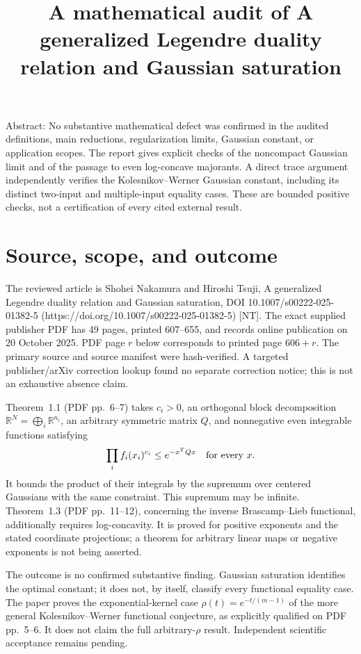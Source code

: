 \documentclass[10pt]{article}
\title{A mathematical audit of
A generalized Legendre duality relation and Gaussian saturation}
\author{}
\date{}
\begin{document}
\maketitle
Abstract: No substantive mathematical defect was confirmed in the audited definitions, main reductions, regularization limits, Gaussian constant, or application scopes. The report gives explicit checks of the noncompact Gaussian limit and of the passage to even log-concave majorants. A direct trace argument independently verifies the Kolesnikov–Werner Gaussian constant, including its distinct two-input and multiple-input equality cases. These are bounded positive checks, not a certification of every cited external result.\par
\section*{Source, scope, and outcome}
The reviewed article is Shohei Nakamura and Hiroshi Tsuji, A generalized Legendre duality relation and Gaussian saturation, DOI 10.1007/s00222-025-01382-5 (https://doi.org/10.1007/s00222-025-01382-5) [NT]. The exact supplied publisher PDF has 49 pages, printed 607–655, and records online publication on 20 October 2025. PDF page \(r\) below corresponds to printed page \(606+r\). The primary source and source manifest were hash-verified. A targeted publisher/arXiv correction lookup found no separate correction notice; this is not an exhaustive absence claim.\par
Theorem 1.1 (PDF pp. 6–7) takes \(c_i>0\), an orthogonal block decomposition \(\mathbb R^N=\bigoplus_i\mathbb R^{n_i}\), an arbitrary symmetric matrix \(Q\), and nonnegative even integrable functions satisfying \[\prod_i f_i(x_i)^{c_i}\le e^{-x^TQx}\quad\hbox{for every }x.\] It bounds the product of their integrals by the supremum over centered Gaussians with the same constraint. This supremum may be infinite. Theorem 1.3 (PDF pp. 11–12), concerning the inverse Brascamp–Lieb functional, additionally requires log-concavity. It is proved for positive exponents and the stated coordinate projections; a theorem for arbitrary linear maps or negative exponents is not being asserted.\par
The outcome is no confirmed substantive finding. Gaussian saturation identifies the optimal constant; it does not, by itself, classify every functional equality case. The paper proves the exponential-kernel case \(\rho(t)=e^{-t/(m-1)}\) of the more general Kolesnikov–Werner functional conjecture, as explicitly qualified on PDF pp. 5–6. It does not claim the full arbitrary-\(\rho\) result. Independent scientific acceptance remains pending.\par
\end{document}
